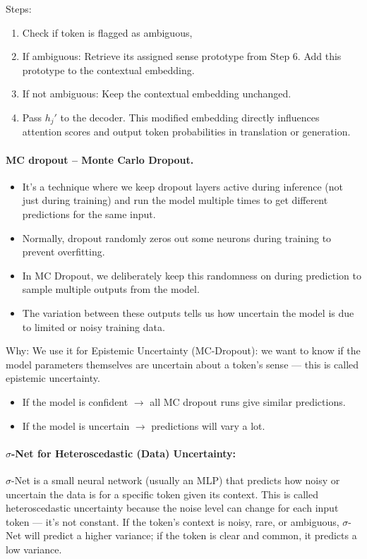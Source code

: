 \documentclass[a4paper,12pt]{article}
\begin{document}
Steps:
\begin{enumerate}
    \item Check if token is flagged as ambiguous,
    \item If ambiguous: Retrieve its assigned sense prototype from Step 6. Add this prototype to the contextual embedding.
    \item If not ambiguous: Keep the contextual embedding unchanged.
    \item Pass $h_j'$ to the decoder. This modified embedding directly influences attention scores and output token probabilities in translation or generation.
\end{enumerate}

\hrulefill

\paragraph{MC dropout -- Monte Carlo Dropout.}
\begin{itemize}
    \item It’s a technique where we keep dropout layers active during inference (not just during training) and run the model multiple times to get different predictions for the same input.
    \item Normally, dropout randomly zeros out some neurons during training to prevent overfitting.
    \item In MC Dropout, we deliberately keep this randomness on during prediction to sample multiple outputs from the model.
    \item The variation between these outputs tells us how uncertain the model is due to limited or noisy training data.
\end{itemize}

Why: We use it for Epistemic Uncertainty (MC-Dropout): we want to know if the model parameters themselves are uncertain about a token’s sense --- this is called epistemic uncertainty.

\begin{itemize}
    \item If the model is confident $\rightarrow$ all MC dropout runs give similar predictions.
    \item If the model is uncertain $\rightarrow$ predictions will vary a lot.
\end{itemize}

\paragraph{$\sigma$-Net for Heteroscedastic (Data) Uncertainty:}
$\sigma$-Net is a small neural network (usually an MLP) that predicts how noisy or uncertain the data is for a specific token given its context. This is called heteroscedastic uncertainty because the noise level can change for each input token --- it’s not constant. If the token’s context is noisy, rare, or ambiguous, $\sigma$-Net will predict a higher variance; if the token is clear and common, it predicts a low variance.
\end{document}

